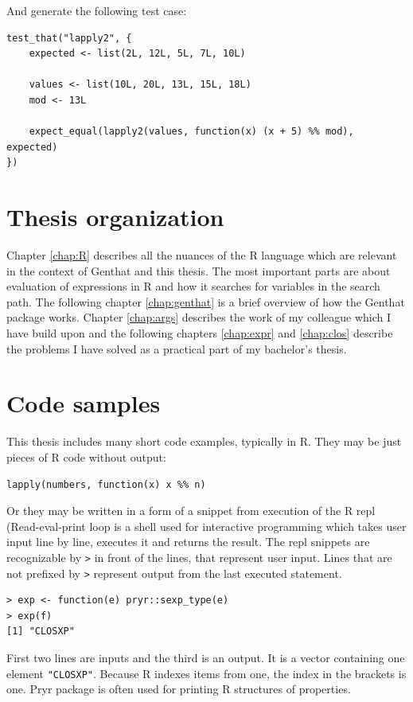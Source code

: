 \documentclass[thesis=B,english]{FITthesis}[2012/10/20]
\begin{document}
And generate the following test case:

\begin{verbatim}
test_that("lapply2", {
    expected <- list(2L, 12L, 5L, 7L, 10L)

    values <- list(10L, 20L, 13L, 15L, 18L)
    mod <- 13L

    expect_equal(lapply2(values, function(x) (x + 5) %% mod), expected)
})
\end{verbatim}


\section{Thesis organization}
 Chapter \ref{chap:R} describes all the nuances of the R language which are relevant in the context of Genthat and this thesis. The most important parts are about evaluation of expressions in R and how it searches for variables in the search path. The following chapter \ref{chap:genthat} is a brief overview of how the Genthat package works. Chapter \ref{chap:args} describes the work of my colleague which I have build upon and the following chapters \ref{chap:expr} and \ref{chap:clos} describe the problems I have solved as a practical part of my bachelor’s thesis. 

\section{Code samples}
This thesis includes many short code examples, typically in R. They may be just pieces of R code without output:

\begin{verbatim}
lapply(numbers, function(x) x %% n)
\end{verbatim}

Or they may be written in a form of a snippet from execution of the R repl (Read-eval-print loop is a shell used for interactive programming which takes user input line by line, executes it and returns the result. The repl snippets are recognizable by \verb|>| in front of the lines, that represent user input. Lines that are not prefixed by \verb|>| represent output from the last executed statement.

\begin{verbatim}
> exp <- function(e) pryr::sexp_type(e)
> exp(f)
[1] "CLOSXP"

\end{verbatim}

First two lines are inputs and the third is an output. It is a vector containing one element \verb|"CLOSXP"|. Because R indexes items from one, the index in the brackets is one. Pryr package\cite{pryr} is often used for printing R structures of properties.
\end{document}
